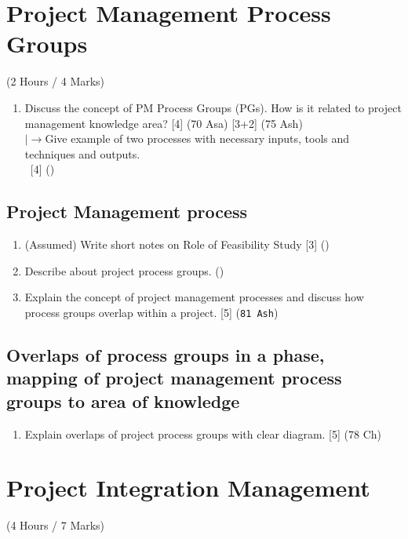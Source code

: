 \documentclass[12pt]{article}
\newcommand{\lb}{\\$\left|\rightarrow\right.$}
\newcommand{\enter}{\\\textcolor{white}{1}}
\begin{document}
\pagebreak

\section{Project Management Process Groups}
  \begin{center}(2 Hours / 4 Marks)\end{center}

  \begin{enumerate}
    \item Discuss the concept of PM Process Groups (PGs). How is it related to project management knowledge area? \hfill [4] (70 Asa) [3+2] (75 Ash)
      \lb Give example of two processes with necessary inputs, tools and techniques and outputs.
      \enter\hfill [4] ()
  \end{enumerate}

  \subsection{Project Management process}
    \begin{enumerate}
      \item (Assumed) Write short notes on Role of Feasibility Study \hfill [3] ()

      \item Describe about project process groups. \hfill ()

      \item Explain the concept of project management processes and discuss how process groups overlap within a project. \hfill [5] (\texttt{81 Ash})
    \end{enumerate}

  \subsection{Overlaps of process groups in a phase, mapping of project management process groups to area of knowledge}
    \begin{enumerate}
      \item Explain overlaps of project process groups with clear diagram. \hfill [5] (78 Ch)
    \end{enumerate}

\pagebreak

\section{Project Integration Management}
  \begin{center}(4 Hours / 7 Marks)\end{center}
\end{document}
